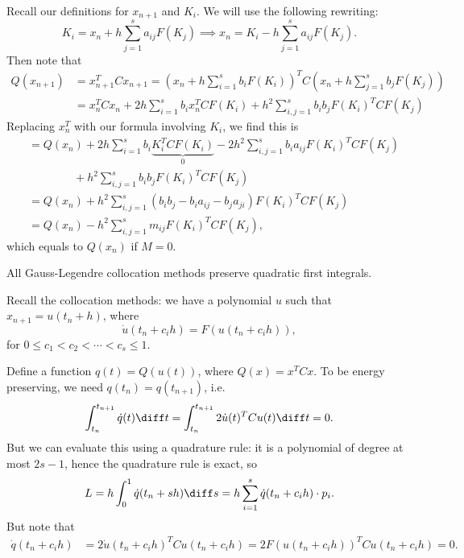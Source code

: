 \documentclass[12pt]{article}
\begin{document}
\begin{proofbox}
	Recall our definitions for $x_{n+1}$ and $K_i$. We will use the following rewriting:
	\[
	K_i = x_n + h \sum_{j = 1}^{s} a_{ij} F(K_j) \implies x_n = K_i - h \sum_{j = 1}^{s} a_{ij} F(K_j).
	\]
	Then note that
	\begin{align*}
		Q(x_{n+1}) &= x_{n+1}^{T}Cx_{n+1} = \left( x_n + h \sum_{i = 1}^s b_i F(K_i) \right)^{T} C \left( x_n + h \sum_{j = 1}^{s} b_j F(K_j) \right) \\
			   &= x_n^{T} C x_n + 2h \sum_{i = 1}^{s} b_i x_n^{T} C F(K_i) + h^2 \sum_{i,j = 1}^{s} b_i b_j F(K_i)^{T} C F(K_j)
	\end{align*}
	Replacing $x_n^{T}$ with our formula involving $K_i$, we find this is
	\begin{align*}
			   &= Q(x_n) + 2 h \sum_{i = 1}^{s} b_i \underbrace{K_i^{T} C F(K_i)}_{0} - 2h^2 \sum_{i, j = 1}^{s} b_i a_{ij} F(K_i)^{T} C F(K_j) \\
			   & \qquad \qquad + h^2 \sum_{i, j = 1}^{s} b_i b_j F(K_i)^{T} C F(K_j) \\
			   &= Q(x_n) + h^2 \sum_{i, j = 1}^{s} (b_i b_j - b_i a_{ij} - b_j a_{ji}) F(K_i)^{T} C F(K_j) \\
			   &= Q(x_n) - h^2 \sum_{i,j = 1}^{s} m_{ij} F(K_i)^{T} C F(K_j),
	\end{align*}
	which equals to $Q(x_n)$ if $M = 0$.
\end{proofbox}

\begin{proposition}
	All Gauss-Legendre collocation methods preserve quadratic first integrals.
\end{proposition}

\begin{proofbox}
	Recall the collocation methods: we have a polynomial $u$ such that $x_{n+1} = u(t_n + h)$, where
	\[
	\dot u(t_n + c_ih) = F(u(t_n + c_ih)),
	\]
	for $0 \leq c_1 < c_2 < \cdots < c_s \leq 1$.

	Define a function $q(t) = Q(u(t))$, where $Q(x) = x^{T}C x$. To be energy preserving, we need $q(t_n) = q(t_{n+1})$, i.e.
	\[
	\int_{t_n}^{t_{n+1}} \dot q(t) \diff t = \int_{t_n}^{t_{n+1}} 2 \dot u(t)^{T} C u(t) \diff t = 0.
	\]
	But we can evaluate this using a quadrature rule: it is a polynomial of degree at most $2s-1$, hence the quadrature rule is exact, so
	\[
	L = h \int_0^{1} \dot q(t_n + sh) \diff s = h \sum_{i = 1}^{s} \dot q(t_n + c_i h) \cdot p_i.
	\]
	But note that
	\begin{align*}
		\dot q(t_n + c_i h) &= 2 \dot u (t_n + c_i h)^{T} C u(t_n + c_i h) = 2 F(u(t_n + c_i h))^{T} C u(t_n + c_i h) = 0.
	\end{align*}
\end{proofbox}
\end{document}

